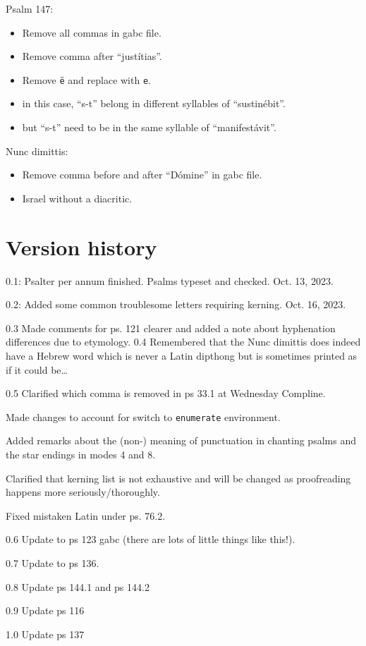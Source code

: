\documentclass[11pt]{article}
\begin{document}
  
    Psalm 147:
  \begin{itemize}
      \item Remove all commas in gabc file.
          \item Remove comma after ``justítias''.
    \item Remove \texttt{ë} and replace with \texttt{e}.
    \item in this case, ``s-t'' belong in different syllables of ``sustinébit''.
    \item but ``s-t'' need to be in the same syllable of ``manifestávit''.
  
    \end{itemize}
    
    Nunc dimittis:
    
      \begin{itemize}
  \item Remove comma before and after ``Dómine'' in gabc file.
  \item Israel without a diacritic.
  \end{itemize}
  
  \section{Version history}
0.1: Psalter per annum finished. Psalms typeset and checked. Oct. 13, 2023.

0.2: Added some common troublesome letters requiring kerning. Oct. 16, 2023. 

0.3 Made comments for ps. 121 clearer and added a note about hyphenation differences due to etymology.
0.4 Remembered that the Nunc dimittis does indeed have a Hebrew word which is never a Latin dipthong but is sometimes printed as if it could be…

0.5 Clarified which comma is removed in ps 33.1 at Wednesday Compline. 

Made changes to account for switch to \verb|enumerate| environment.

Added remarks about the (non-) meaning of punctuation in chanting psalms and the star endings in modes 4 and 8.

Clarified that kerning list is not exhaustive and will be changed as proofreading happens more seriously/thoroughly.

Fixed mistaken Latin under ps. 76.2.

0.6 Update to ps 123 gabc (there are lots of little things like this!).

0.7 Update to ps 136.

0.8 Update ps 144.1 and ps 144.2

0.9 Update ps 116

1.0 Update ps 137
\end{document}
